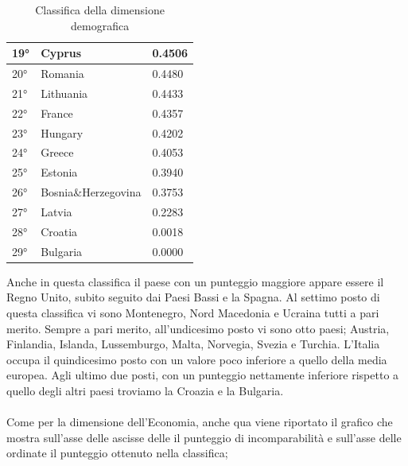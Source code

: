 \documentclass[a4paper,12pt, openright]{report}
\begin{document}
\begin{table}[h!]
\begin{tabular}{ |l|l|l|  }
        \hline
        19° & Cyprus  & 0.4506 \\
        \hline
        20° & Romania  & 0.4480 \\
        \hline
        21° & Lithuania & 0.4433 \\
        \hline
        22° & France  & 0.4357 \\
        \hline
        23° & Hungary  & 0.4202 \\
        \hline
        24° & Greece  & 0.4053 \\
        \hline
        25° & Estonia  & 0.3940\\
        \hline
        26° & Bosnia\&Herzegovina  & 0.3753 \\
        \hline
        27° & Latvia  & 0.2283 \\
        \hline
        28° & Croatia  & 0.0018\\
        \hline
        29° & Bulgaria & 0.0000 \\
        \hline
    \end{tabular}
    \caption{Classifica della dimensione demografica}
    \label{table:1}
\end{table}
\newpage

Anche in questa classifica il paese con un punteggio maggiore appare essere il Regno Unito, subito seguito dai Paesi Bassi e la Spagna. Al settimo posto di questa classifica vi sono 
Montenegro, Nord Macedonia e Ucraina tutti a pari merito. Sempre a pari merito, all'undicesimo posto vi sono otto paesi; Austria, Finlandia, Islanda, Lussemburgo, Malta, Norvegia, 
Svezia e Turchia. L'Italia occupa il quindicesimo posto con un valore poco inferiore a quello della media europea. Agli ultimo due posti, con un punteggio nettamente inferiore
rispetto a quello degli altri paesi troviamo la Croazia e la Bulgaria. 
\\
\\
Come per la dimensione dell'Economia, anche qua viene riportato il grafico che mostra sull'asse delle ascisse delle il punteggio di incomparabilità e sull'asse delle 
ordinate il punteggio ottenuto nella classifica; 
\end{document}
